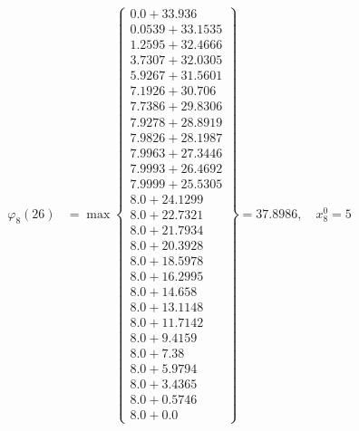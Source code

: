 \documentclass{article}
\begin{document}
\begin{align*}
  
\varphi_{8}(26) &= \max \left\{ \begin{array}{c}
0.0 + 33.936 \\
 0.0539 + 33.1535 \\
 1.2595 + 32.4666 \\
 3.7307 + 32.0305 \\
 5.9267 + 31.5601 \\
 7.1926 + 30.706 \\
 7.7386 + 29.8306 \\
 7.9278 + 28.8919 \\
 7.9826 + 28.1987 \\
 7.9963 + 27.3446 \\
 7.9993 + 26.4692 \\
 7.9999 + 25.5305 \\
 8.0 + 24.1299 \\
 8.0 + 22.7321 \\
 8.0 + 21.7934 \\
 8.0 + 20.3928 \\
 8.0 + 18.5978 \\
 8.0 + 16.2995 \\
 8.0 + 14.658 \\
 8.0 + 13.1148 \\
 8.0 + 11.7142 \\
 8.0 + 9.4159 \\
 8.0 + 7.38 \\
 8.0 + 5.9794 \\
 8.0 + 3.4365 \\
 8.0 + 0.5746 \\
 8.0 + 0.0
\end{array} \right\}=37.8986,\quad x_{8}^0=5\\
  
  
  

\end{align*}
\end{document}
